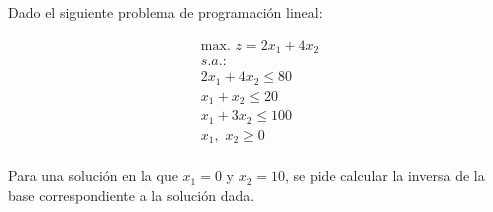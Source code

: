 Dado el siguiente problema de programación lineal:

\begin{equation}
\begin{split}
\mbox{max. } z = 2x_1 + 4x_2\\
s.a.:\\
2x_1 + 4x_2 \leq  80\\
 x_1 +  x_2 \leq 20\\
 x_1 + 3x_2 \leq 100\\
x_1,\,\,x_2 \geq 0\\
\end{split}
\end{equation}

Para una solución en la que $x_1 = 0$ y $x_2 = 10$, se pide calcular la inversa de la base correspondiente a la solución dada.